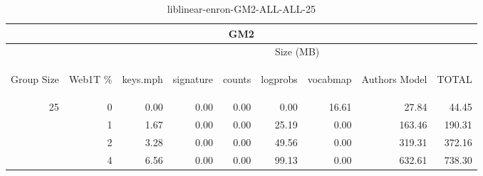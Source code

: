 \begin{center}
\begin{table}[htbp] 
 \begin{center}
\begin{tabular}{ | r | r | r | r | r | r | r | r | r |}
\hline
\multicolumn{9}{|c|}{GM2}\\
\hline
 & & \multicolumn{7}{|c|}{Size (MB)}\\ \cline{3-9}
\begin{sideways}Group Size\end{sideways} & \begin{sideways}Web1T \% \end{sideways} & \begin{sideways}keys.mph\end{sideways} & \begin{sideways}signature\end{sideways} & \begin{sideways}counts\end{sideways} & \begin{sideways}logprobs\end{sideways} & \begin{sideways}vocabmap\end{sideways} & \begin{sideways}Authors Model \end{sideways} & \begin{sideways}TOTAL\end{sideways}\\
\hline
\multirow{3}{*}{25}
 & 0 & 0.00 & 0.00 & 0.00 & 0.00 & 16.61 & 27.84 & 44.45\\ \cline{2-9}
 & 1 & 1.67 & 0.00 & 0.00 & 25.19 & 0.00 & 163.46 & 190.31\\ \cline{2-9}
 & 2 & 3.28 & 0.00 & 0.00 & 49.56 & 0.00 & 319.31 & 372.16\\ \cline{2-9}
 & 4 & 6.56 & 0.00 & 0.00 & 99.13 & 0.00 & 632.61 & 738.30\\ \cline{2-9}
\hline
\end{tabular}
\caption{liblinear-enron-GM2-ALL-ALL-25}
\label{table:liblinear-enron-GM2-ALL-ALL-25}
\end{center}
 \end{table}
\end{center}

